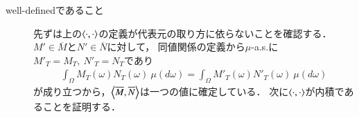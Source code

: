 			
	\begin{prf}\mbox{}
		\begin{description}
			\item[well-definedであること]
				先ずは上の$\inprod<\cdot,\cdot>$の定義が代表元の取り方に依らないことを確認する．
				$M' \in \overline{M}$と$N' \in \overline{N}$に対して，
				同値関係の定義から$\mu$-a.s.に$M'_T = M_T,\ N'_T = N_T$であり
				\begin{align}
					\int_{\Omega} M_T(\omega)N_T(\omega)\ \mu(d\omega) = \int_{\Omega} M'_T(\omega)N'_T(\omega)\ \mu(d\omega)
				\end{align}
				が成り立つから，$\inprod<\overline{M},\overline{N}>$は一つの値に確定している．
				次に$\inprod<\cdot,\cdot>$が内積であることを証明する．
	

\end{description}
\end{prf}
